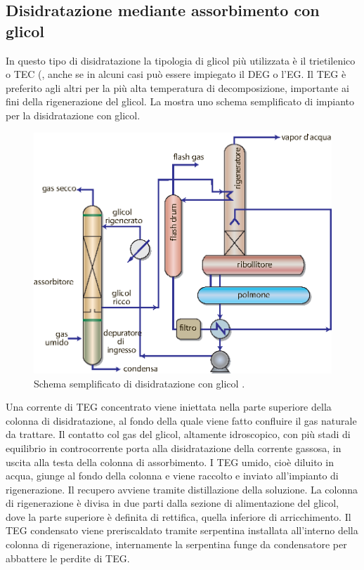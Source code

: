 \subsection{Disidratazione mediante assorbimento con glicol}
In questo tipo di disidratazione la tipologia di glicol più utilizzata è il trietilenico o TEC (, anche se in alcuni casi può essere impiegato il DEG o l'EG. Il TEG è preferito agli altri per la più alta temperatura di decomposizione, importante ai fini della rigenerazione del glicol. La  mostra uno schema semplificato di impianto per la disidratazione con glicol.
\begin{figure}[htbp]
    \centering
    \includegraphics[width=.7\textwidth]{fig/impianti/deidratazioneglicol.eps}
    \caption{Schema semplificato di disidratazione con glicol \parencite{bianco2005impiantigas}.}
    \label{fig:disidratazioneglicol}
\end{figure}
Una corrente di TEG concentrato viene iniettata nella parte superiore della colonna di disidratazione, al fondo della quale viene fatto confluire il gas naturale da trattare. Il contatto col gas del glicol, altamente idroscopico, con più stadi di equilibrio in controcorrente porta alla disidratazione della corrente gassosa, in uscita alla testa della colonna di assorbimento. I TEG umido, cioè diluito in acqua, giunge al fondo della colonna e viene raccolto e inviato all'impianto di rigenerazione. Il recupero avviene tramite distillazione della soluzione.
La colonna di rigenerazione è divisa in due parti dalla sezione di alimentazione del glicol, dove la parte superiore è definita di rettifica, quella inferiore di arricchimento. Il TEG condensato viene preriscaldato tramite serpentina installata all'interno della colonna di rigenerazione, internamente la serpentina funge da condensatore per abbattere le perdite di TEG. \\
